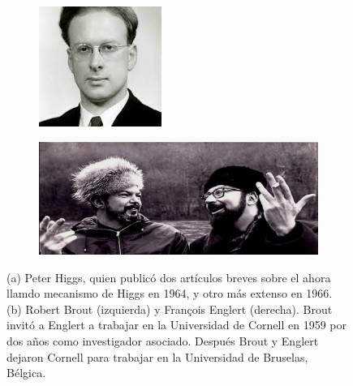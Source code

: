 \begin{figure}[h]
	\centering
	\begin{subfigure}{0.3\textwidth}
	\includegraphics[scale=0.8]{images/higgs_joven.jpeg}
	\caption{}
	\end{subfigure}
	\begin{subfigure}{0.6\textwidth}
	\centering
	\includegraphics[scale=0.25]{images/brout_englert.png}
	\caption{}
	\end{subfigure}
	\caption{(a) Peter Higgs, quien public\'o dos art\'iculos breves sobre
        el ahora llamdo mecanismo de Higgs en 1964, y otro m\'as extenso
        en 1966. (b) Robert Brout
        (izquierda) y Fran\c{c}ois Englert (derecha). Brout invit\'o a
        Englert a trabajar en la Universidad de Cornell en 1959 por
        dos años como investigador asociado. Despu\'es
        Brout y Englert dejaron Cornell para trabajar en la
        Universidad de Bruselas, B\'elgica.}
	\end{figure}
